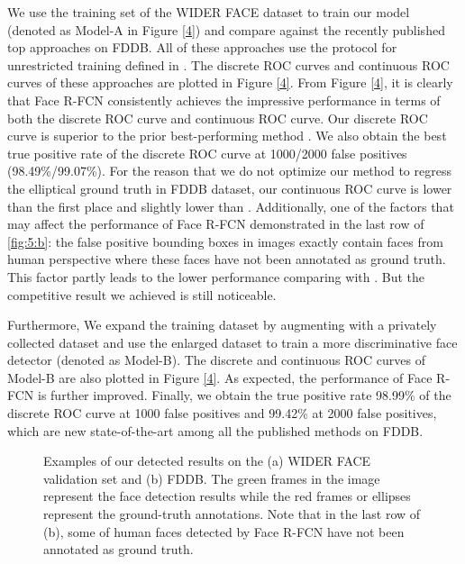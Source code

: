 \documentclass{article} \usepackage{nips13submit_e,times}
\newcommand{\ignore}[1]{}
\begin{document}
We use the training set of the WIDER FACE dataset to train our model (denoted as Model-A in Figure \ref{4}) and compare against the recently published top approaches \cite{sfd,HR,spl,ldcf,conv3d,mxnet} on FDDB. All of these approaches use the protocol for unrestricted training defined in \cite{fddb}. The discrete ROC curves and continuous ROC curves of these approaches are plotted in Figure \ref{4}. From Figure \ref{4}, it is clearly that Face R-FCN consistently achieves the impressive\ignore{state-of-the-art} performance in terms of both the discrete ROC curve and continuous ROC curve. Our discrete ROC curve is superior to the prior best-performing method\ignore{one} \cite{sfd,facercnn}. We also obtain the best true positive rate of the discrete ROC curve at 1000/2000 false positives (98.49\%/99.07\%). For the reason that we do not optimize our method to regress the elliptical ground truth in FDDB dataset, our continuous ROC curve is lower than the first place \cite{sfd} and slightly lower than \cite{facercnn,conv3d}. Additionally, one of the factors that may affect the performance of Face R-FCN demonstrated in the last row of \ref{fig:5:b}: the false positive bounding boxes in images exactly contain faces from human perspective where these faces have not been annotated as ground truth. This factor partly leads to the lower performance comparing with \cite{facercnn,conv3d,sfd}. But the competitive result we achieved is still noticeable.  

Furthermore, We expand the training dataset by augmenting with a privately collected dataset and use the enlarged dataset to train a more discriminative face detector (denoted as Model-B). The discrete and continuous ROC curves of Model-B are also plotted in Figure \ref{4}. 
As expected, the performance of Face R-FCN is further improved. Finally, we obtain the true positive rate 98.99\% of the discrete ROC curve at 1000 false positives and 99.42\% at 2000 false positives, which are new state-of-the-art among all the published methods on FDDB.






\begin{figure*}
  \centering


  \caption{
Examples of our detected results on the (a) WIDER FACE validation set and (b) FDDB. The green frames in the image represent the face detection results while the red frames or ellipses represent the ground-truth annotations.
Note that in the last row of (b), some of human faces detected by Face R-FCN have not been annotated as ground truth.
    }\label{5}
\end{figure*}
\end{document}
